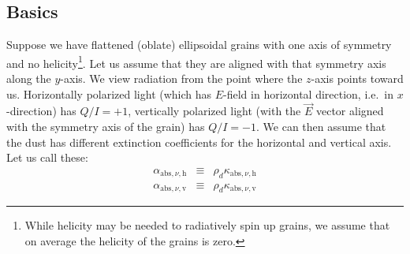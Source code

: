 \documentclass{report}
\begin{document}
\subsection{Basics}
\label{sec-basic-equations}
%
Suppose we have flattened (oblate) ellipsoidal grains with one axis of
symmetry and no helicity\footnote{While helicity may be needed to
  radiatively spin up grains, we assume that on average the helicity of the
  grains is zero.}. Let us assume that they are aligned with that symmetry
axis along the $y$-axis. We view radiation from the point where the $z$-axis
points toward us. Horizontally polarized light (which has $E$-field in
horizontal direction, i.e.\ in $x$-direction) has $Q/I=+1$, vertically
polarized light (with the $\vec E$ vector aligned with the symmetry axis of
the grain) has $Q/I=-1$. We can then assume that the dust has different
extinction coefficients for the horizontal and vertical axis. Let us call
these:
\begin{eqnarray}
\alpha_{\mathrm{abs},\nu,\mathrm{h}} &\equiv& \rho_d\kappa_{\mathrm{abs},\nu,\mathrm{h}}\\
\alpha_{\mathrm{abs},\nu,\mathrm{v}} &\equiv& \rho_d\kappa_{\mathrm{abs},\nu,\mathrm{v}}
\end{eqnarray}
\end{document}
